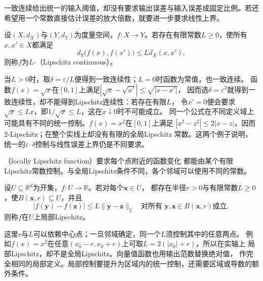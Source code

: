 一致连续给出统一的输入阈值，却没有要求输出误差与输入误差成固定比例。若还希望用一个常数直接估计误差的放大倍数，就要进一步要求线性上界。
\begin{definition}[Lipschitz连续映射]
\label{def:analysis-lipschitz-continuity}
设$(X,d_X)$与$(Y,d_Y)$为度量空间，$f:X\to Y$。若存在有限常数$L\geq0$，使所有$x,x'\in X$都满足
\begin{equation}
  d_Y\bigl(f(x),f(x')\bigr)\leq Ld_X(x,x'),
\label{eq:analysis-lipschitz-condition}
\end{equation}
则称$f$为$L$-（Lipschitz continuous）。
\end{definition}
当$L>0$时，取$\delta=\varepsilon/L$便得到一致连续性；$L=0$时函数为常值，也一致连续。
函数$f(x)=\sqrt{x}$在$[0,1]$上满足$|\sqrt{x}-\sqrt{x'}|\leq\sqrt{|x-x'|}$，
因而选$\delta=\varepsilon^2$就得到一致连续性，却不能得到Lipschitz连续性：若存在有限$L$，
令$x'=0$便会要求$\sqrt{x}\leq Lx$，即$1/\sqrt{x}\leq L$，这在$x\downarrow0$时不可能成立。
同一个公式在不同定义域上可能具有不同的统一控制。$f(x)=x^2$在$[0,1]$上满足
$|x^2-z^2|\leq2|x-z|$，因而$2$-Lipschitz；在整个实线上却没有有限的全局Lipschitz
常数。这两个例子说明，统一的$\varepsilon$--$\delta$控制与线性误差上界仍是不同要求。

（locally Lipschitz function）要求每个点附近的函数变化
都能由某个有限Lipschitz常数控制。与全局Lipschitz条件不同，各个邻域可以使用不同的常数。
\begin{definition}[局部Lipschitz函数]
\label{def:analysis-local-lipschitz}
设$U\subseteq\mathbb{R}^d$为开集，$f:U\to\mathbb{R}$。若对每个$\bm{x}\in U$，
都存在半径$r>0$与有限常数$L\geq0$，使$B(\bm{x},r)\subseteq U$，并且
\[
  |f(\bm{y})-f(\bm{z})|
  \leq L\lVert\bm{y}-\bm{z}\rVert_2
  \quad\text{对所有 }\bm{y},\bm{z}\in B(\bm{x},r)\text{成立},
\]
则称$f$在$U$上局部Lipschitz。
\end{definition}

这里$r$与$L$可以依赖中心点；一旦邻域确定，同一个$L$须控制其中的任意两点。
例如$f(x)=x^2$在任意$(x_0-r,x_0+r)$上可取$L=2(|x_0|+r)$，所以在实轴上
局部Lipschitz，却不是全局Lipschitz。向量值函数也用输出范数替换绝对值，
作完全相同的局部定义。局部控制要提升为区域内的统一控制，还需要区域或导数的额外条件。


